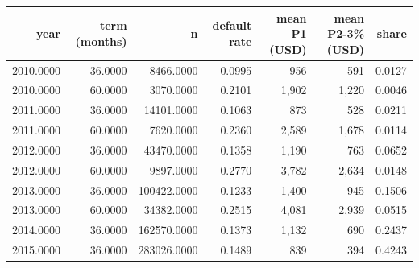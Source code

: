 \begin{tabular}{rrrrrrr}
\toprule
year & term (months) & n & default rate & mean P1 (USD) & mean P2-3\% (USD) & share \\
\midrule
2010.0000 & 36.0000 & 8466.0000 & 0.0995 & 956 & 591 & 0.0127 \\
2010.0000 & 60.0000 & 3070.0000 & 0.2101 & 1,902 & 1,220 & 0.0046 \\
2011.0000 & 36.0000 & 14101.0000 & 0.1063 & 873 & 528 & 0.0211 \\
2011.0000 & 60.0000 & 7620.0000 & 0.2360 & 2,589 & 1,678 & 0.0114 \\
2012.0000 & 36.0000 & 43470.0000 & 0.1358 & 1,190 & 763 & 0.0652 \\
2012.0000 & 60.0000 & 9897.0000 & 0.2770 & 3,782 & 2,634 & 0.0148 \\
2013.0000 & 36.0000 & 100422.0000 & 0.1233 & 1,400 & 945 & 0.1506 \\
2013.0000 & 60.0000 & 34382.0000 & 0.2515 & 4,081 & 2,939 & 0.0515 \\
2014.0000 & 36.0000 & 162570.0000 & 0.1373 & 1,132 & 690 & 0.2437 \\
2015.0000 & 36.0000 & 283026.0000 & 0.1489 & 839 & 394 & 0.4243 \\
\bottomrule
\end{tabular}
